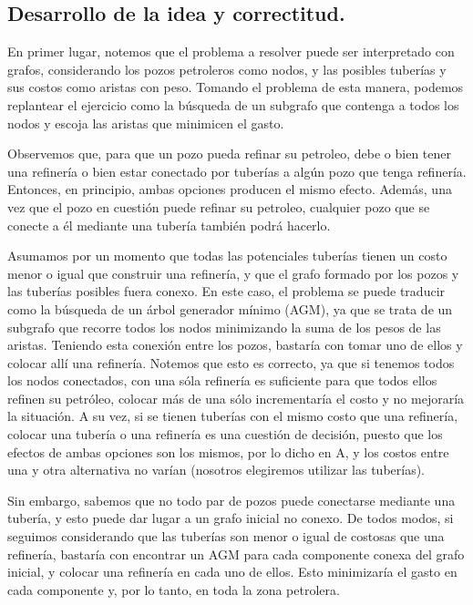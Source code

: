 \vspace*{0.6cm}

\subsection{Desarrollo de la idea y correctitud.}

\vspace*{0.3cm}

En primer lugar, notemos que el problema a resolver puede ser interpretado con grafos, considerando los pozos petroleros como nodos, y las posibles tuberías y sus costos como aristas con peso.  Tomando el problema de esta manera, podemos replantear el ejercicio como la búsqueda de un subgrafo que contenga a todos los nodos y escoja las aristas que minimicen el gasto.

Observemos que, para que un pozo pueda refinar su petroleo, debe o bien tener una refinería o bien estar conectado por tuberías a algún pozo que tenga refinería. Entonces, en principio, ambas opciones producen el mismo efecto. Además, una vez que el pozo en cuestión puede refinar su petroleo, cualquier pozo que se conecte a él mediante una tubería también podrá hacerlo.

Asumamos por un momento que todas las potenciales tuberías tienen un costo menor o igual que construir una refinería, y que el grafo formado por los pozos y las tuberías posibles fuera conexo.  En este caso, el problema se puede traducir como la búsqueda de un árbol generador mínimo (AGM), ya que se trata de un subgrafo que recorre todos los nodos minimizando la suma de los pesos de las aristas.  Teniendo esta conexión entre los pozos, bastaría con tomar uno de ellos y colocar allí una refinería. Notemos que esto es correcto, ya que si tenemos todos los nodos conectados, con una sóla refinería es suficiente para que todos ellos refinen su petróleo, colocar más de una sólo incrementaría el costo y no mejoraría la situación.  A su vez, si se tienen tuberías con el mismo costo que una refinería, colocar una tubería o una refinería es una cuestión de decisión, puesto que los efectos de ambas opciones son los mismos, por lo dicho en A, y los costos entre una y otra alternativa no varían (nosotros elegiremos utilizar las tuberías).

Sin embargo, sabemos que no todo par de pozos puede conectarse mediante una tubería, y esto puede dar lugar a un grafo inicial no conexo.  De todos modos, si seguimos considerando que las tuberías son menor o igual de costosas que una refinería, bastaría con encontrar un AGM para cada componente conexa del grafo inicial, y colocar una refinería en cada uno de ellos. Esto minimizaría el gasto en cada componente y, por lo tanto, en toda la zona petrolera. 


